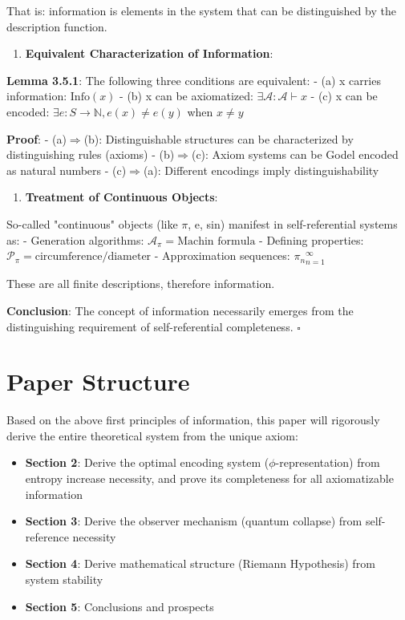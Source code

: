    That is: information is elements in the system that can be distinguished by the description function.
\begin{enumerate}
\item \textbf{Equivalent Characterization of Information}:
\end{enumerate}
   
   \textbf{Lemma 3.5.1}: The following three conditions are equivalent:
\label{thm:1.4}
   - (a) x carries information: $\text{Info}(x)$
   - (b) x can be axiomatized: $\exists \mathcal{A}: \mathcal{A} \vdash x$
   - (c) x can be encoded: $\exists e: S \to \mathbb{N}, e(x) \neq e(y)$ when $x \neq y$
   
   \textbf{Proof}:
   - (a)$\Rightarrow$(b): Distinguishable structures can be characterized by distinguishing rules (axioms)
   - (b)$\Rightarrow$(c): Axiom systems can be Godel encoded as natural numbers
   - (c)$\Rightarrow$(a): Different encodings imply distinguishability
   
\begin{enumerate}
\item \textbf{Treatment of Continuous Objects}:
\end{enumerate}
   So-called "continuous" objects (like $\pi$, e, sin) manifest in self-referential systems as:
   - Generation algorithms: $\mathcal{A}_\pi = {\text{Machin formula}}$
   - Defining properties: $\mathcal{P}_\pi = {\text{circumference/diameter}}$
   - Approximation sequences: ${\pi_n}_{n=1}^{\infty}$
   
   These are all finite descriptions, therefore information.

\textbf{Conclusion}: The concept of information necessarily emerges from the distinguishing requirement of self-referential completeness. $\square$

\section{Paper Structure}
\label{sec:ch03_derivation:paper-structure}

Based on the above first principles of information, this paper will rigorously derive the entire theoretical system from the unique axiom:

\begin{itemize}
\item \textbf{Section 2}: Derive the optimal encoding system ($\phi$-representation) from entropy increase necessity, and prove its completeness for all axiomatizable information
\item \textbf{Section 3}: Derive the observer mechanism (quantum collapse) from self-reference necessity
\item \textbf{Section 4}: Derive mathematical structure (Riemann Hypothesis) from system stability
\item \textbf{Section 5}: Conclusions and prospects
\end{itemize}

